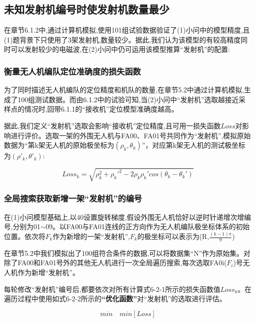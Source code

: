 \documentclass[withoutpreface,bwprint]{cumcmthesis}
\begin{document}
	\subsection{未知发射机编号时使发射机数量最少}
	
	在章节6.1.2中,通过计算机模拟,使用101组试验数据验证了(1)小问中的模型精度,且(1)题背景下只使用了3架发射机,数量较少。据此,我们认为该模型的有较高精度同时可以发射较少的电磁波,在(2)小问中仍可运用该模型推算“发射机”的配置:
	
	\subsubsection{衡量无人机编队定位准确度的损失函数}
	
	为了同时描述无人机编队的定位精度和机队的数量,在章节5.2中通过计算机模拟,生成了100组测试数据。而由6.1.2中的试验可知,当(2)小问中“发射机”选取越接近采样点的情况时,回带6.1.1的“接收机”定位模型准确度越高。
	
	据此,我们定义“发射机”选取会影响“接收机”定位精度,且可用一损失函数$Loss$对影响进行评价。选取一架的外围无人机与FA00、FA01号共同作为“发射机”,模拟原始数据为“第k架无人机的原始极坐标为$(\rho_{k},\theta_{k})$”，对应第k架无人机的测试极坐标为$(\rho'_{k},\theta'_{k})$:
	
	\begin{equation}
		\tag{6-2-1}
		Loss_{k} = \sqrt{\rho_{k}^{2}+\rho_{k}'^{2}-2\rho_{k}\rho_{k}'cos(\theta_{k}-\theta_{k}')}
	\end{equation}
	
	\subsubsection{全局搜索获取新增一架“发射机”的编号}
	
	在(1)小问模型基础上,以40\textdegree 设置旋转梯度,假设外围无人机恰好以逆时针递增次增编号,分别为01$\sim$09。以FA00与FA01连线的正方向作为无人机编队极坐标体系的初始位置。依次将$F_{k}$作为新增的一架“发射机”,$F_{k}$的极坐标可以表示为(R,$\frac{(k-1)\pi}{9}$)
	
	在章节5.2中我们模拟出了100组符合条件的数据,可以将数据集“N”作为原始集。对除了FA00和FA01号外的其他无人机进行一次全局遍历搜索,每次选取FA0i($F_{i}$)号无人机作为新增“发射机”。
	
	每轮修改“发射机”编号后,都要依次对所有计算式6-2-1所示的损失函数值$Loss_{k}$。在遍历过程中使用如式6-2-2所示的\textbf{“优化函数”}对“发射机”的选取进行评估。
	
	\begin{equation}
		\tag{6-2-2}
		min\quad min[Loss]  
	\end{equation}
	
\end{document}
